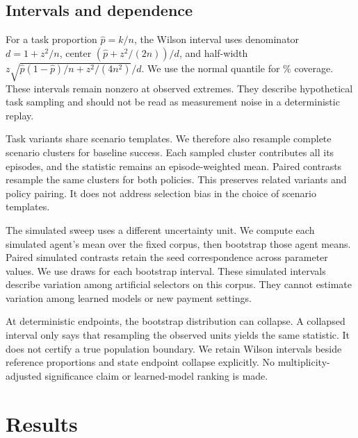 \documentclass{article}
\begin{document}
\subsection{Intervals and dependence}
For a task proportion $\hat p=k/n$, the Wilson interval uses denominator $d=1+z^2/n$, center $(\hat p+z^2/(2n))/d$, and half-width $z\sqrt{\hat p(1-\hat p)/n+z^2/(4n^2)}/d$. We use the normal quantile for \CILevel{}\% coverage. These intervals remain nonzero at observed extremes. They describe hypothetical task sampling and should not be read as measurement noise in a deterministic replay.\par
Task variants share scenario templates. We therefore also resample complete scenario clusters for baseline success. Each sampled cluster contributes all its episodes, and the statistic remains an episode-weighted mean. Paired contrasts resample the same clusters for both policies. This preserves related variants and policy pairing. It does not address selection bias in the choice of scenario templates.\par
The simulated sweep uses a different uncertainty unit. We compute each simulated agent's mean over the fixed corpus, then bootstrap those agent means. Paired simulated contrasts retain the seed correspondence across parameter values. We use \BootstrapDraws{} draws for each bootstrap interval. These simulated intervals describe variation among artificial selectors on this corpus. They cannot estimate variation among learned models or new payment settings.\par
At deterministic endpoints, the bootstrap distribution can collapse. A collapsed interval only says that resampling the observed units yields the same statistic. It does not certify a true population boundary. We retain Wilson intervals beside reference proportions and state endpoint collapse explicitly. No multiplicity-adjusted significance claim or learned-model ranking is made.\par
\section{Results}
\end{document}
